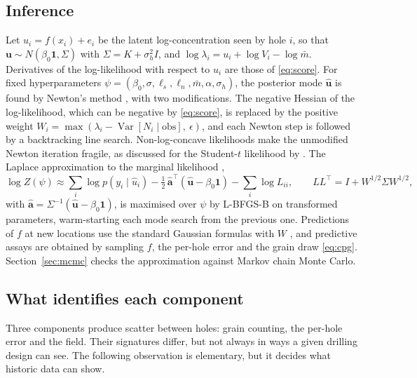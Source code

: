 \documentclass[11pt,a4paper]{article}
\theoremstyle{remark}
\newcommand{\mbar}{\bar m}
\newcommand{\Var}{\operatorname{Var}}
\begin{document}
\subsection{Inference}

Let $u_i = f(x_i) + e_i$ be the latent log-concentration seen by hole $i$, so that $\bm u \sim N(\beta_0\bm 1, \Sigma)$ with $\Sigma = K + \sigma_h^2 I$, and $\log\lambda_i = u_i + \log V_i - \log\mbar$. Derivatives of the log-likelihood with respect to $u_i$ are those of \eqref{eq:score}. For fixed hyperparameters $\psi = (\beta_0, \sigma, \ell_s, \ell_n, \mbar, \alpha, \sigma_h)$, the posterior mode $\hat{\bm u}$ is found by Newton's method \citep[Alg.~3.1]{Rasmussen2006}, with two modifications. The negative Hessian of the log-likelihood, which can be negative by \eqref{eq:score}, is replaced by the positive weight $W_i = \max(\lambda_i - \Var[N_i \mid \mathrm{obs}],\ \epsilon)$, and each Newton step is followed by a backtracking line search. Non-log-concave likelihoods make the unmodified Newton iteration fragile, as discussed for the Student-$t$ likelihood by \citet{Jylanki2011}. The Laplace approximation to the marginal likelihood \citep{Tierney1986,Williams1998},
\begin{equation}\label{eq:laplace}
\log Z(\psi) \approx \sum_i \log p(y_i \mid \hat u_i) - \tfrac{1}{2}\,\hat{\bm a}^\top(\hat{\bm u} - \beta_0\bm 1) - \sum_i \log L_{ii},\qquad
LL^\top = I + W^{1/2} \Sigma W^{1/2},
\end{equation}
with $\hat{\bm a} = \Sigma^{-1}(\hat{\bm u} - \beta_0\bm 1)$, is maximised over $\psi$ by L-BFGS-B \citep{Byrd1995} on transformed parameters, warm-starting each mode search from the previous one. Predictions of $f$ at new locations use the standard Gaussian formulas with $W$ \citep{Rasmussen2006}, and predictive assays are obtained by sampling $f$, the per-hole error and the grain draw \eqref{eq:cpg}. Section~\ref{sec:mcmc} checks the approximation against Markov chain Monte Carlo.

\subsection{What identifies each component}\label{sec:ident}

Three components produce scatter between holes: grain counting, the per-hole error and the field. Their signatures differ, but not always in ways a given drilling design can see. The following observation is elementary, but it decides what historic data can show.
\end{document}
